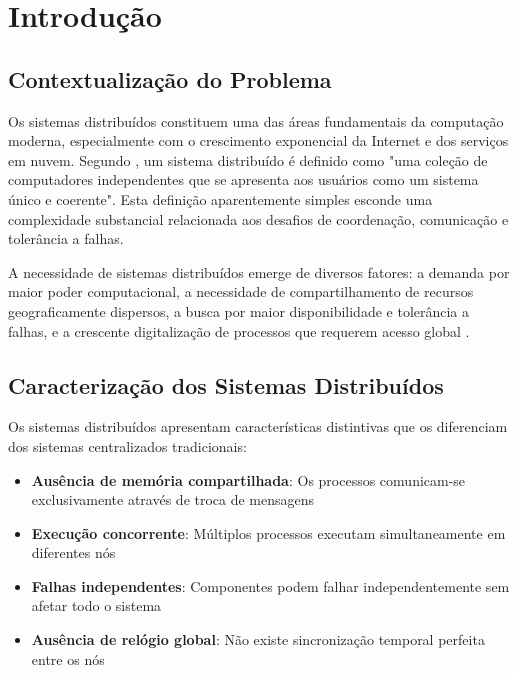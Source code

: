 \section{Introdução}

\subsection{Contextualização do Problema}

Os sistemas distribuídos constituem uma das áreas fundamentais da computação moderna, especialmente com o crescimento exponencial da Internet e dos serviços em nuvem. Segundo , um sistema distribuído é definido como "uma coleção de computadores independentes que se apresenta aos usuários como um sistema único e coerente". Esta definição aparentemente simples esconde uma complexidade substancial relacionada aos desafios de coordenação, comunicação e tolerância a falhas.

A necessidade de sistemas distribuídos emerge de diversos fatores: a demanda por maior poder computacional, a necessidade de compartilhamento de recursos geograficamente dispersos, a busca por maior disponibilidade e tolerância a falhas, e a crescente digitalização de processos que requerem acesso global \cite{coulouris2013sistemas}.

\subsection{Caracterização dos Sistemas Distribuídos}

Os sistemas distribuídos apresentam características distintivas que os diferenciam dos sistemas centralizados tradicionais:

\begin{itemize}
    \item \textbf{Ausência de memória compartilhada}: Os processos comunicam-se exclusivamente através de troca de mensagens
    \item \textbf{Execução concorrente}: Múltiplos processos executam simultaneamente em diferentes nós
    \item \textbf{Falhas independentes}: Componentes podem falhar independentemente sem afetar todo o sistema
    \item \textbf{Ausência de relógio global}: Não existe sincronização temporal perfeita entre os nós
\end{itemize}

